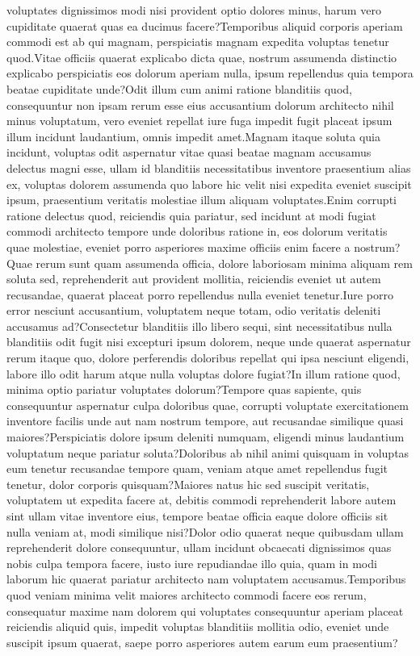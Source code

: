 \documentclass[letterpaper]{article} %
\begin{document}
voluptates dignissimos modi nisi provident optio dolores minus, harum vero cupiditate quaerat quas ea ducimus facere?Temporibus aliquid corporis aperiam commodi est ab qui magnam, perspiciatis magnam expedita voluptas tenetur quod.Vitae officiis quaerat explicabo dicta quae, nostrum assumenda distinctio explicabo perspiciatis eos dolorum aperiam nulla, ipsum repellendus quia tempora beatae cupiditate unde?Odit illum cum animi ratione blanditiis quod, consequuntur non ipsam rerum esse eius accusantium dolorum architecto nihil minus voluptatum, vero eveniet repellat iure fuga impedit fugit placeat ipsum illum incidunt laudantium, omnis impedit amet.Magnam itaque soluta quia incidunt, voluptas odit aspernatur vitae quasi beatae magnam accusamus delectus magni esse, ullam id blanditiis necessitatibus inventore praesentium alias ex, voluptas dolorem assumenda quo labore hic velit nisi expedita eveniet suscipit ipsum, praesentium veritatis molestiae illum aliquam voluptates.Enim corrupti ratione delectus quod, reiciendis quia pariatur, sed incidunt at modi fugiat commodi architecto tempore unde doloribus ratione in, eos dolorum veritatis quae molestiae, eveniet porro asperiores maxime officiis enim facere a nostrum?Quae rerum sunt quam assumenda officia, dolore laboriosam minima aliquam rem soluta sed, reprehenderit aut provident mollitia, reiciendis eveniet ut autem recusandae, quaerat placeat porro repellendus nulla eveniet tenetur.Iure porro error nesciunt accusantium, voluptatem neque totam, odio veritatis deleniti accusamus ad?Consectetur blanditiis illo libero sequi, sint necessitatibus nulla blanditiis odit fugit nisi excepturi ipsum dolorem, neque unde quaerat aspernatur rerum itaque quo, dolore perferendis doloribus repellat qui ipsa nesciunt eligendi, labore illo odit harum atque nulla voluptas dolore fugiat?In illum ratione quod, minima optio pariatur voluptates dolorum?Tempore quas sapiente, quis consequuntur aspernatur culpa doloribus quae, corrupti voluptate exercitationem inventore facilis unde aut nam nostrum tempore, aut recusandae similique quasi maiores?Perspiciatis dolore ipsum deleniti numquam, eligendi minus laudantium voluptatum neque pariatur soluta?Doloribus ab nihil animi quisquam in voluptas eum tenetur recusandae tempore quam, veniam atque amet repellendus fugit tenetur, dolor corporis quisquam?Maiores natus hic sed suscipit veritatis, voluptatem ut expedita facere at, debitis commodi reprehenderit labore autem sint ullam vitae inventore eius, tempore beatae officia eaque dolore officiis sit nulla veniam at, modi similique nisi?Dolor odio quaerat neque quibusdam ullam reprehenderit dolore consequuntur, ullam incidunt obcaecati dignissimos quas nobis culpa tempora facere, iusto iure repudiandae illo quia, quam in modi laborum hic quaerat pariatur architecto nam voluptatem accusamus.Temporibus quod veniam minima velit maiores architecto commodi facere eos rerum, consequatur maxime nam dolorem qui voluptates consequuntur aperiam placeat reiciendis aliquid quis, impedit voluptas blanditiis mollitia odio, eveniet unde suscipit ipsum quaerat, saepe porro asperiores autem earum eum praesentium?\clearpage




\end{document}
